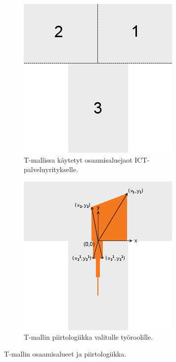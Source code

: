 \documentclass[a4paper,finnish,12pt]{article}
\begin{document}
\begin{figure}[!ht]
	\centering
	\begin{subfigure}[t]{0.45\textwidth}
		\includegraphics[width=\textwidth]{T_areas.png}
		\caption{T-mallissa käytetyt osaamisaluejaot ICT-palveluyritykselle.}
		\label{fig:Tareas}
	\end{subfigure}
	\hfill
	\begin{subfigure}[t]{0.45\textwidth}
		\includegraphics[width=\textwidth]{T_drawing_logics.png}
		\caption{T-mallin piirtologiikka valitulle työroolille.}
		\label{fig:Tlogics}
	\end{subfigure}
	\caption{T-mallin osaamisalueet ja piirtologiikka.}
\end{figure}
\end{document}
